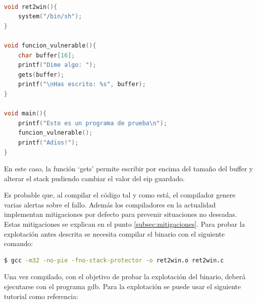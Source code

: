 \begin{lstlisting}[language=C, caption=Código vulnerable con función ret2win, label=snippet:simplebof]

void ret2win(){
    system("/bin/sh");
}

void funcion_vulnerable(){
    char buffer[16];
    printf("Dime algo: ");
    gets(buffer);
    printf("\nHas escrito: %s", buffer);
}

void main(){
    printf("Esto es un programa de prueba\n");
    funcion_vulnerable();
    printf("Adios!");
}
\end{lstlisting}
\FloatBarrier
En este caso, la función `gets' permite escribir por encima del tamaño del buffer y alterar el stack pudiendo cambiar el valor del \acrshort{eip} guardado.

Es probable que, al compilar el código tal y como está, el compilador genere varias alertas sobre el fallo.
Además los compiladores en la actualidad implementan mitigaciones por defecto para prevenir situaciones no deseadas.
Estas mitigaciones se explican en el punto \ref{subsec:mitigaciones}.
Para probar la explotación antes descrita se necesita compilar el binario con el siguiente comando:
\begin{lstlisting}[language=bash, caption=Compilado de código con pocas mitigaciones y arquitectura 32bit]
$ gcc -m32 -no-pie -fno-stack-protector -o ret2win.o ret2win.c
\end{lstlisting}
Una vez compilado, con el objetivo de probar la explotación del binario, deberá ejecutarse con el programa \acrfull{gdb}.
Para la explotación se puede usar el siguiente tutorial como referencia:
